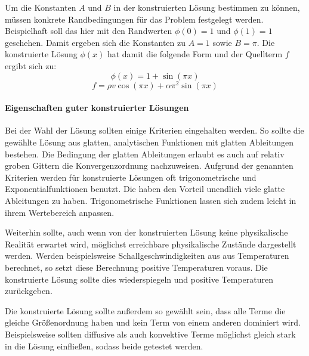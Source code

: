 Um die Konstanten $A$ und $B$ in der konstruierten Lösung bestimmen zu können,
müssen konkrete Randbedingungen für das Problem festgelegt werden. Beispielhaft
soll das hier mit den Randwerten $\phi(0) = 1$ und $\phi(1) = 1$ geschehen.
Damit ergeben sich die Konstanten zu $A = 1$ sowie $B = \pi$. Die 
konstruierte Lösung $\phi(x)$ hat damit die folgende Form und der Quellterm $f$
ergibt sich zu:
\begin{equation*}
  \phi(x) = 1 + \sin(\pi x)
\end{equation*}
\begin{equation*}
  f=\rho v \cos(\pi x) + \alpha \pi^2 \sin(\pi x)
  \label{eq:quellterm}
\end{equation*}


\paragraph{Eigenschaften guter konstruierter Lösungen}

Bei der Wahl der Lösung sollten einige Kriterien eingehalten werden. So sollte die gewählte Lösung
aus glatten, analytischen Funktionen mit glatten Ableitungen bestehen. Die Bedingung der glatten Ableitungen
erlaubt es auch auf relativ groben Gittern die Konvergenzordnung nachzuweisen.
Aufgrund der genannten Kriterien werden für konstruierte Lösungen oft trigonometrische und Exponentialfunktionen benutzt.
Die haben den Vorteil unendlich viele glatte Ableitungen zu haben. Trigonometrische Funktionen lassen
sich zudem leicht in ihrem Wertebereich anpassen.

Weiterhin sollte, auch wenn von der konstruierten Lösung keine physikalische Realität erwartet wird, möglichst
erreichbare physikalische Zustände dargestellt werden. Werden beispielsweise Schallgeschwindigkeiten aus
aus Temperaturen berechnet, so setzt diese Berechnung positive Temperaturen voraus. Die konstruierte Lösung sollte dies wiederspiegeln
und positive Temperaturen zurückgeben.

Die konstruierte Lösung sollte außerdem so gewählt sein, dass alle Terme die gleiche Größenordnung haben
und kein Term von einem anderen dominiert wird. Beispielsweise sollten diffusive als auch konvektive Terme
möglichst gleich stark in die Lösung einfließen, sodass beide getestet werden.
